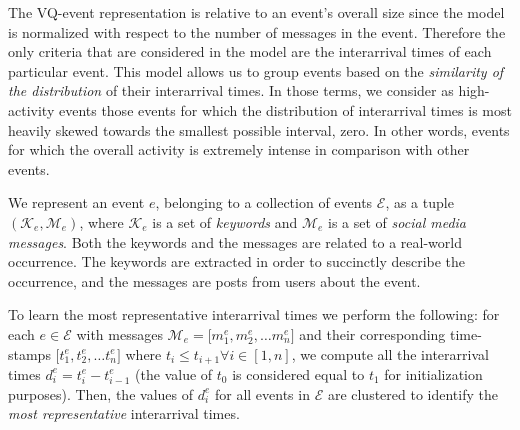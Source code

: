 
The VQ-event representation is relative to an event's overall size since the
model is normalized with respect to the number of messages in the event.
%
Therefore the only criteria that are considered in the model are the
interarrival times of each particular event. 
%
This model allows us to group events based on the {\em similarity of the
distribution} of their interarrival times. 
%
In those terms, we consider as high-activity events those events for which the
distribution of interarrival times is most heavily skewed towards the smallest
possible interval, zero. 
%
In other words, events for which the overall activity is extremely intense in
comparison with other events.


We represent an event $\mathit{e}$, belonging to a collection of events
$\mathcal{E}$, as a tuple $(\mathcal{K}_\mathit{e}, \mathcal{M}_\mathit{e})$,
where $\mathcal{K}_\mathit{e}$ is a set of \emph{keywords} and
$\mathcal{M}_\mathit{e}$ is a set of \emph{social media messages}.
%
Both the keywords and the messages are related to a real-world occurrence. 
%
The keywords are extracted in order to succinctly describe the occurrence, and
the messages are posts from users about the event.


To learn the most representative interarrival times we perform the following:
%
for each $\mathit{e} \in \mathcal{E}$ with messages $\mathcal{M}_\mathit{e} =
\lbrack m_{1}^\mathit{e}, m_{2}^\mathit{e}, \ldots m_{n}^\mathit{e} \rbrack$ and
their corresponding time-stamps $\lbrack t_{1}^\mathit{e}, t_{2}^\mathit{e},
\ldots t_{n}^\mathit{e} \rbrack$ where $t_{\mathit{i}} \leq t_{\mathit{i}+1}
\forall \mathit{i} \in [1,n]$, we compute all the interarrival times
$d_{\mathit{i}}^\mathit{e} =
t_{\mathit{i}}^\mathit{e}-t_{\mathit{i}-1}^\mathit{e}$ (the value of $t_{0}$ is
considered equal to $t_{1}$ for initialization purposes). 
%
Then, the values of $d_{\mathit{i}}^\mathit{e}$ for all events in $\mathcal{E}$
are clustered to identify the {\em most representative} interarrival times.


